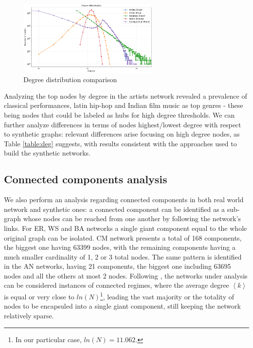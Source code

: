 \documentclass[sigchi]{acmart}
\begin{document}
\begin{figure}[H]
\centering
\includegraphics[width=7cm]{img/net_dist.png}
\caption{Degree distribution comparison}
\label{fig: Misogynous class distribution}
\end{figure}

Analyzing the top nodes by degree in the artists network revealed a prevalence of classical performances, latin hip-hop and Indian film music as top genres - these being nodes that could be labeled as hubs for high degree thresholds. We can further analyze differences in terms of nodes highest/lowest degree with respect to synthetic graphs: relevant differences arise focusing on high degree nodes, as Table \ref{table:deg} suggests, with results consistent with the approaches used to build the synthetic networks. 

\subsection{Connected components analysis}
We also perform an analysis regarding connected components in both real world network and synthetic ones: a connected component can be identified as a sub-graph whose nodes can be reached from one another by following the network's links. For ER, WS and BA networks a single giant component equal to the whole original graph can be isolated. CM network presents a total of 168 components, the biggest one having 63399 nodes, with the remaining components having a much smaller cardinality of 1, 2 or 3 total nodes. The same pattern is identified in the AN networks, having 21 components, the biggest one including 63695 nodes and all the others at most 2 nodes. Following \cite[p. 59]{barabasi16}, the networks under analysis can be considered instances of connected regimes, where the average degree $\left \langle k \right \rangle$ is equal or very close to $ln(N)$\footnote{In our particular case, $ln(N)=11.062$.}, leading the vast majority or the totality of nodes to be encapsuled into a single giant component, still keeping the network relatively sparse.
\end{document}
